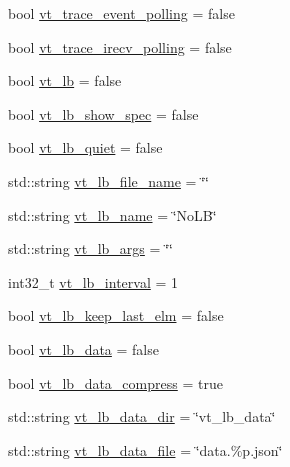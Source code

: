 \begin{DoxyCompactItemize}
\item 
bool \hyperlink{structvt_1_1arguments_1_1_app_config_a43da3e179ed4ad72411a41b46fae97e0}{vt\+\_\+trace\+\_\+event\+\_\+polling} = false
\item 
bool \hyperlink{structvt_1_1arguments_1_1_app_config_a7753691852b0b5475c953789173cf555}{vt\+\_\+trace\+\_\+irecv\+\_\+polling} = false
\item 
bool \hyperlink{structvt_1_1arguments_1_1_app_config_a7f1564af24349d7f524f7b509d92fd22}{vt\+\_\+lb} = false
\item 
bool \hyperlink{structvt_1_1arguments_1_1_app_config_aeec1d5697a4bfc5af3a8b763b88ae964}{vt\+\_\+lb\+\_\+show\+\_\+spec} = false
\item 
bool \hyperlink{structvt_1_1arguments_1_1_app_config_a7942c44d537f66f507209de26cbbb55d}{vt\+\_\+lb\+\_\+quiet} = false
\item 
std\+::string \hyperlink{structvt_1_1arguments_1_1_app_config_a53287cd1d5e9fbb62931b956b0770d93}{vt\+\_\+lb\+\_\+file\+\_\+name} = \char`\"{}\char`\"{}
\item 
std\+::string \hyperlink{structvt_1_1arguments_1_1_app_config_a1d8ed9d03eb82a15a81ad5e1ca6388b4}{vt\+\_\+lb\+\_\+name} = \char`\"{}No\+LB\char`\"{}
\item 
std\+::string \hyperlink{structvt_1_1arguments_1_1_app_config_ab2811622e1d9627bd2af4add74b7ffc9}{vt\+\_\+lb\+\_\+args} = \char`\"{}\char`\"{}
\item 
int32\+\_\+t \hyperlink{structvt_1_1arguments_1_1_app_config_a8d23afe2b4a2ac7d7354e3379f5b24ae}{vt\+\_\+lb\+\_\+interval} = 1
\item 
bool \hyperlink{structvt_1_1arguments_1_1_app_config_ab5dd6ec0c6828ff0ee8a539d63273e36}{vt\+\_\+lb\+\_\+keep\+\_\+last\+\_\+elm} = false
\item 
bool \hyperlink{structvt_1_1arguments_1_1_app_config_a1827a1321107d431d893a3d31b781580}{vt\+\_\+lb\+\_\+data} = false
\item 
bool \hyperlink{structvt_1_1arguments_1_1_app_config_a884062d3eff71606d4bab20b8c79b28a}{vt\+\_\+lb\+\_\+data\+\_\+compress} = true
\item 
std\+::string \hyperlink{structvt_1_1arguments_1_1_app_config_ab1ca57ce4941e2a3e38e3e992bd15dc3}{vt\+\_\+lb\+\_\+data\+\_\+dir} = \char`\"{}vt\+\_\+lb\+\_\+data\char`\"{}
\item 
std\+::string \hyperlink{structvt_1_1arguments_1_1_app_config_a2e5c9eeb4b33b8fa6a5aa982a7b7b27a}{vt\+\_\+lb\+\_\+data\+\_\+file} = \char`\"{}data.\%p.\+json\char`\"{}
\item 

\end{DoxyCompactItemize}
